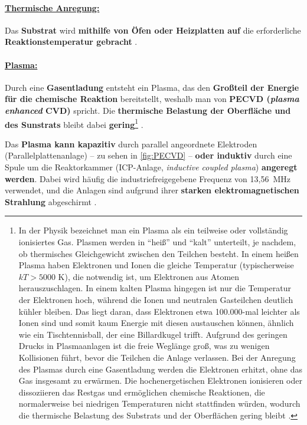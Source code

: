 \documentclass{article} %
\begin{document}
\paragraph{\uline{Thermische Anregung:}} Das \textbf{Substrat} wird \textbf{mithilfe von Öfen oder Heizplatten auf} die erforderliche \textbf{Reaktionstemperatur gebracht} \cite{keplinger2024CVD}.

\vspace{0.0em}

\paragraph{\uline{Plasma:}} Durch eine \textbf{Gasentladung} entsteht ein Plasma, das den \textbf{Großteil der Energie für die chemische Reaktion} bereitstellt, weshalb man von \textbf{PECVD (\textit{plasma enhanced} CVD)} spricht. Die \textbf{thermische Belastung der Oberfläche und des Sunstrats} bleibt dabei \textbf{gering}\footnote{In der Physik bezeichnet man ein Plasma als ein teilweise oder vollständig ionisiertes Gas. Plasmen werden in ``heiß'' und ``kalt'' unterteilt, je nachdem, ob thermisches Gleichgewicht zwischen den Teilchen besteht. In einem heißen Plasma haben Elektronen und Ionen die gleiche Temperatur (typischerweise $kT > 5000$ K), die notwendig ist, um Elektronen aus Atomen herauszuschlagen. In einem kalten Plasma hingegen ist nur die Temperatur der Elektronen hoch, während die Ionen und neutralen Gasteilchen deutlich kühler bleiben. Das liegt daran, dass Elektronen etwa 100.000-mal leichter als Ionen sind und somit kaum Energie mit diesen austauschen können, ähnlich wie ein Tischtennisball, der eine Billardkugel trifft. Aufgrund des geringen Drucks in Plasmaanlagen ist die freie Weglänge groß, was zu wenigen Kollisionen führt, bevor die Teilchen die Anlage verlassen. Bei der Anregung des Plasmas durch eine Gasentladung werden die Elektronen erhitzt, ohne das Gas insgesamt zu erwärmen. Die hochenergetischen Elektronen ionisieren oder dissoziieren das Restgas und ermöglichen chemische Reaktionen, die normalerweise bei niedrigen Temperaturen nicht stattfinden würden, wodurch die thermische Belastung des Substrats und der Oberflächen gering bleibt \cite{keplinger2024CVD}.} \cite{keplinger2024CVD}.

\vspace{0.0em}

Das \textbf{Plasma kann kapazitiv} durch parallel angeordnete Elektroden (Parallelplattenanlage) -- zu sehen in \autoref{fig:PECVD} -- \textbf{oder induktiv} durch eine Spule um die Reaktorkammer (ICP-Anlage, \textit{inductive coupled plasma}) \textbf{angeregt werden}. Dabei wird häufig die industriefreigegebene Frequenz von 13,56~MHz verwendet, und die Anlagen sind aufgrund ihrer \textbf{starken elektromagnetischen Strahlung} abgeschirmt \cite{keplinger2024CVD}.
\end{document}
